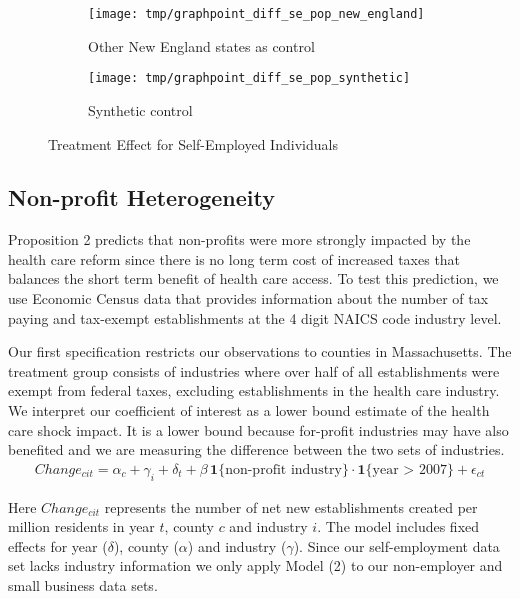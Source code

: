 \documentclass[12pt]{article}
\begin{document}
\begin{figure}[H]
	\centering
	\begin{subfigure}[b]{0.495\textwidth}
		\texttt{[image: tmp/graphpoint\_diff\_se\_pop\_new\_england]}
		\caption{Other New England states as control}
	\end{subfigure}
		\begin{subfigure}[b]{0.495\textwidth}
		\texttt{[image: tmp/graphpoint\_diff\_se\_pop\_synthetic]}
		\caption{Synthetic control}
	\end{subfigure}
	\caption{Treatment Effect for Self-Employed Individuals}
	\label{fig:state_contrast}
\end{figure}

\subsection{Non-profit Heterogeneity}

Proposition 2 predicts that non-profits were more strongly impacted by the health care reform since there is no long term cost of increased taxes that balances the short term benefit of health care access. To test this prediction, we use Economic Census data that provides information about the number of tax paying and tax-exempt establishments at the 4 digit NAICS code industry level.  

Our first specification restricts our observations to counties in Massachusetts. The treatment group consists of industries where over half of all establishments were exempt from federal taxes, excluding establishments in the health care industry. We interpret our coefficient of interest as a lower bound estimate of the health care shock impact. It is a lower bound because for-profit industries may have also benefited and we are measuring the difference between the two sets of industries.
\begin{align}
Change_{cit} = \alpha_c + \gamma_i + \delta_t + \beta \, \mathbf{1}\{\text{non-profit industry}\} \cdot \mathbf{1}\{\text{year > 2007}\} + \epsilon_{ct}
\end{align}

Here $Change_{cit}$ represents the number of net new establishments created per million residents in year $t$, county $c$ and industry $i$. The model includes fixed effects for year ($\delta$), county ($\alpha$) and industry ($\gamma$). Since our self-employment data set lacks industry information we only apply Model (2) to our non-employer and small business data sets. 
\end{document}
